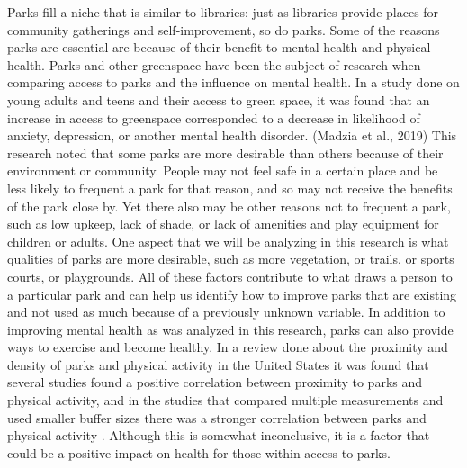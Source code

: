 \documentclass[3p, authoryear]{elsarticle} %
\begin{document}
Parks fill a niche that is similar to libraries: just as libraries provide
places for community gatherings and self-improvement, so do parks. Some of the
reasons parks are essential are because of their benefit to mental health and
physical health. Parks and other greenspace have been the subject of research
when comparing access to parks and the influence on mental health. In a study
done on young adults and teens and their access to green space, it was found
that an increase in access to greenspace corresponded to a decrease in
likelihood of anxiety, depression, or another mental health disorder. (Madzia et
al., 2019) This research noted that some parks are more desirable than others
because of their environment or community. People may not feel safe in a certain
place and be less likely to frequent a park for that reason, and so may not
receive the benefits of the park close by. Yet there also may be other reasons
not to frequent a park, such as low upkeep, lack of shade, or lack of amenities
and play equipment for children or adults. One aspect that we will be analyzing
in this research is what qualities of parks are more desirable, such as more
vegetation, or trails, or sports courts, or playgrounds. All of these factors
contribute to what draws a person to a particular park and can help us identify
how to improve parks that are existing and not used as much because of a
previously unknown variable. In addition to improving mental health as was
analyzed in this research, parks can also provide ways to exercise and become
healthy. In a review done about the proximity and density of parks and physical
activity in the United States it was found that several studies found a positive
correlation between proximity to parks and physical activity, and in the studies
that compared multiple measurements and used smaller buffer sizes there was a
stronger correlation between parks and physical activity \citep{bancroft2015association}.
Although this is somewhat inconclusive, it is a factor that could be a positive
impact on health for those within access to parks.
\end{document}
